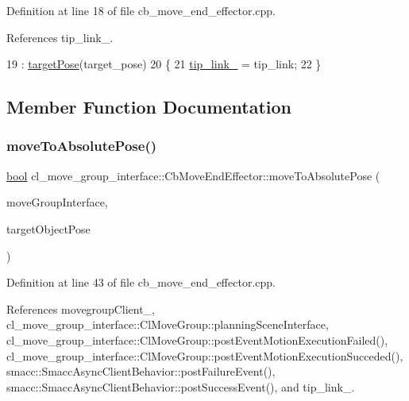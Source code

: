 Definition at line 18 of file cb\+\_\+move\+\_\+end\+\_\+effector.\+cpp.



References tip\+\_\+link\+\_\+.


\begin{DoxyCode}
19   : \hyperlink{classcl__move__group__interface_1_1CbMoveEndEffector_ab0d0c060e52c6f09a6af727e6e954064}{targetPose}(target\_pose)
20 \{
21   \hyperlink{classcl__move__group__interface_1_1CbMoveEndEffector_a4b6f4468b2db565a07119ac90c067436}{tip\_link\_} = tip\_link;
22 \}
\end{DoxyCode}


\subsection{Member Function Documentation}
\mbox{\label{classcl__move__group__interface_1_1CbMoveEndEffector_a533ec599a0e248f3cb024e9cdf148db2}} 
\subsubsection{\texorpdfstring{move\+To\+Absolute\+Pose()}{moveToAbsolutePose()}}
{\footnotesize\ttfamily \hyperlink{classbool}{bool} cl\+\_\+move\+\_\+group\+\_\+interface\+::\+Cb\+Move\+End\+Effector\+::move\+To\+Absolute\+Pose (\begin{DoxyParamCaption}\item[{moveit\+::planning\+\_\+interface\+::\+Move\+Group\+Interface \&}]{move\+Group\+Interface,  }\item[{geometry\+\_\+msgs\+::\+Pose\+Stamped \&}]{target\+Object\+Pose }\end{DoxyParamCaption})\hspace{0.3cm}{\ttfamily [protected]}}



Definition at line 43 of file cb\+\_\+move\+\_\+end\+\_\+effector.\+cpp.



References movegroup\+Client\+\_\+, cl\+\_\+move\+\_\+group\+\_\+interface\+::\+Cl\+Move\+Group\+::planning\+Scene\+Interface, cl\+\_\+move\+\_\+group\+\_\+interface\+::\+Cl\+Move\+Group\+::post\+Event\+Motion\+Execution\+Failed(), cl\+\_\+move\+\_\+group\+\_\+interface\+::\+Cl\+Move\+Group\+::post\+Event\+Motion\+Execution\+Succeded(), smacc\+::\+Smacc\+Async\+Client\+Behavior\+::post\+Failure\+Event(), smacc\+::\+Smacc\+Async\+Client\+Behavior\+::post\+Success\+Event(), and tip\+\_\+link\+\_\+.



